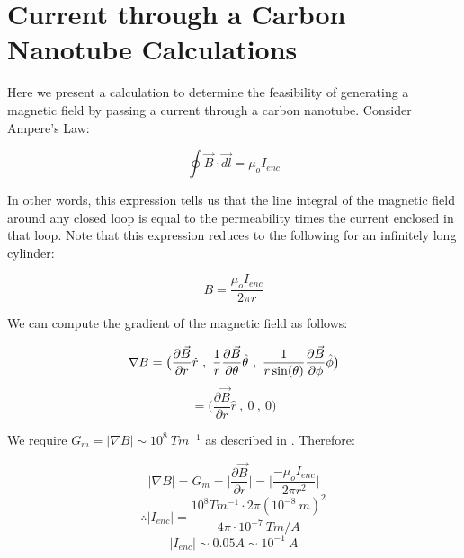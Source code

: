 \documentclass[%
 reprint,
nofootinbib,
 amsmath,amssymb,
 aps,
]{revtex4-2}
\begin{document}
\section{Current through a Carbon Nanotube Calculations}\label{Current Calculations}

Here we present a calculation to determine the feasibility of generating a magnetic field by passing a current through a carbon nanotube. Consider Ampere's Law:

\begin{equation*}
    \oint \Vec{B}\cdot \Vec{dl} = \mu_o I_{enc}
\end{equation*}

In other words, this expression tells us that the line integral of the magnetic field around any closed loop is equal to the permeability times the current enclosed in that loop. Note that this expression reduces to the following for an infinitely long cylinder:

\begin{equation*}
    B = \frac{\mu_o I_{enc}}{2\pi r}
\end{equation*}

We can compute the gradient of the magnetic field as follows:


\begin{equation*}
    \nabla B  = \big (  \frac{\partial \Vec{B}}{\partial r} \hat{r} \ , \ \frac{1}{r}  \frac{\partial \Vec{B}}{\partial \theta} \hat{\theta} \ , \ \frac{1}{r \sin(\theta)} \frac{\partial \Vec{B}}{\partial \phi} \hat{\phi}  \big )
    \newline
\end{equation*}
\begin{equation*}
    = \big (  \frac{\partial \Vec{B}}{\partial r} \hat{r} \ , \ 0 \ , \ 0  \big )
\end{equation*}

We require $G_m = | \nabla B | \sim 10^8 \ Tm^{-1}$ as described in \cite{project_paper}. Therefore:

\begin{equation*}
    | \nabla B | = G_m = \big | \frac{\partial \Vec{B}}{\partial r} \big | = \big | \frac{- \mu_o I_{enc}}{2 \pi r^2} \big |
\end{equation*}
\begin{equation*}
    \therefore \big | I_{enc} \big | = \frac{10^8 Tm^{-1} \cdot 2\pi (10^{-8}\ m)^2}{4\pi \cdot 10^{-7} \ Tm/A}
\end{equation*}
\begin{equation*}
    \big | I_{enc} \big | \sim 0.05 A \sim 10^{-1}\ A
\end{equation*}
\end{document}
